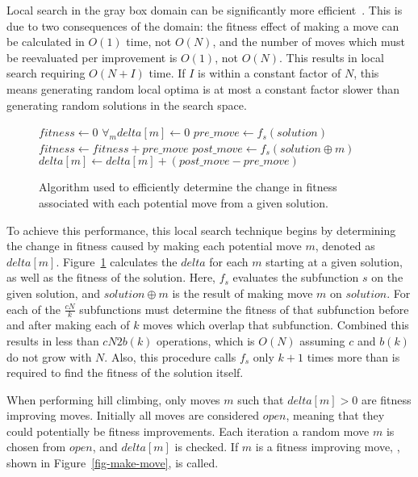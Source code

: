 Local search in the gray box domain can be significantly more efficient~\cite{whitley:2013:greedy}. This is due
to two consequences of the domain: the fitness effect of making a move can be calculated in $O(1)$ time, not $O(N)$,
and the number of moves which must be reevaluated per improvement is $O(1)$, not $O(N)$. This results in local
search requiring $O(N+I)$ time. If $I$ is within a constant factor of $N$, this means generating random local
optima is at most a constant factor slower than generating random solutions in the search space.

\begin{figure}
  \begin{algorithmic}[1]
    \State $fitness \leftarrow 0$
    \State $\forall_{m} delta[m] \leftarrow 0$
      \State $pre\_move \leftarrow f_s(solution)$
      \State $fitness \leftarrow fitness + pre\_move$
        \State $post\_move \leftarrow f_s(solution \oplus m)$
        \State $delta[m] \leftarrow delta[m] + (post\_move - pre\_move)$
      \EndFor
    \EndFor
  \EndProcedure
\end{algorithmic}
  \caption{Algorithm used to efficiently determine the change in fitness
           associated with each potential move from a given solution.}
  \label{fig-initialize-delta}
\end{figure}

To achieve this performance, this local search technique begins by determining the change in fitness
caused by making each potential move $m$, denoted as $delta[m]$. Figure~\ref{fig-initialize-delta}
calculates the $delta$ for each $m$ starting at a given solution, as well as the fitness of the solution.
Here, $f_s$ evaluates
the subfunction $s$ on the given solution, and $solution \oplus m$ is the result of making move $m$ on $solution$.
For each of the $\frac{cN}{k}$ subfunctions  must determine the fitness of that
subfunction before and after making each of $k$ moves which overlap that subfunction. Combined this
results in less than $cN2b(k)$ operations, which is $O(N)$ assuming $c$ and $b(k)$ do not grow with $N$.
Also, this procedure calls $f_s$ only $k+1$ times more than is required to find the fitness of the solution itself.

When performing hill climbing, only moves $m$ such that $delta[m] > 0$ are fitness improving moves. Initially
all moves are considered $open$, meaning that they could potentially be fitness improvements. Each iteration
a random move $m$ is chosen from $open$, and $delta[m]$ is checked. If $m$ is a fitness improving move,
, shown in Figure~\ref{fig-make-move}, is called.

